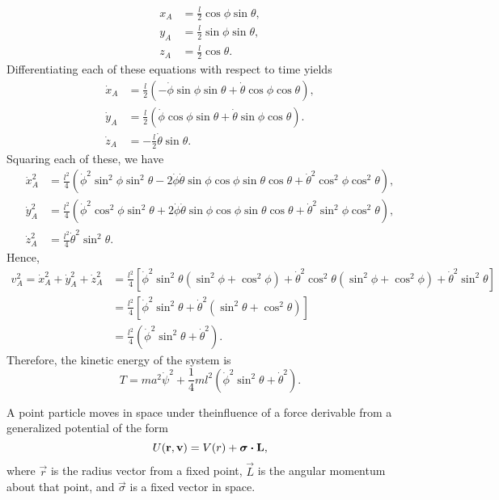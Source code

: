 \begin{questions}
\begin{solution}
\begin{align*}
x_A &= \frac{l}{2} \cos \phi \sin \theta, \\
y_A &= \frac{l}{2} \sin \phi \sin \theta, \\
z_A &= \frac{l}{2} \cos \theta.
\end{align*}
Differentiating each of these equations with respect to time yields
\begin{align*}
\dot{x}_A &= \frac{l}{2} ( -\dot{\phi} \sin \phi \sin \theta + \dot{\theta} \cos \phi \cos \theta ), \\
\dot{y}_A &= \frac{l}{2} ( \dot{\phi} \cos \phi \sin \theta + \dot{\theta} \sin \phi \cos \theta ). \\
\dot{z}_A &= -\frac{l}{2} \dot{\theta} \sin \theta.
\end{align*}
Squaring each of these, we have
\begin{align*}
\dot{x}_A^2 &= \frac{l^2}{4} ( \dot{\phi}^2 \sin^2 \phi \sin^2 \theta - 2 \dot{\phi} \dot{\theta} \sin \phi \cos \phi \sin \theta \cos \theta + \dot{\theta}^2 \cos^2 \phi \cos^2 \theta ), \\
\dot{y}_A^2 &= \frac{l^2}{4} ( \dot{\phi}^2 \cos^2 \phi \sin^2 \theta + 2 \dot{\phi} \dot{\theta} \sin \phi \cos \phi \sin \theta \cos \theta + \dot{\theta}^2 \sin^2 \phi \cos^2 \theta ), \\
\dot{z}_A^2 &= \frac{l^2}{4} \dot{\theta}^2 \sin^2 \theta. 
\end{align*}
Hence,
\begin{align*}
v_A^2 = \dot{x}_A^2 + \dot{y}_A^2 + \dot{z}_A^2 &= \frac{l^2}{4} [ \dot{\phi}^2 \sin^2 \theta ( \sin^2 \phi + \cos^2 \phi ) + \dot{\theta}^2 \cos^2 \theta ( \sin^2 \phi + \cos^2 \phi ) + \dot{\theta}^2 \sin^2 \theta ] \\
&= \frac{l^2}{4} [ \dot{\phi}^2 \sin^2 \theta + \dot{\theta}^2 ( \sin^2 \theta + \cos^2 \theta ) ] \\
&= \frac{l^2}{4} ( \dot{\phi}^2 \sin^2 \theta + \dot{\theta}^2 ).
\end{align*}
Therefore, the kinetic energy of the system is
\[
T = m a^2 \dot{\psi}^2 + \frac{1}{4} m l^2 ( \dot{\phi}^2 \sin^2 \theta + \dot{\theta}^2 ).
\]
\end{solution}

\question A point particle moves in space under theinfluence of a force derivable from a generalized potential of the form
\[
U ( \bm{\mathbf{r}}, \bm{\mathbf{v}} ) = V ( r ) + \bm{\mathbf{\sigma}} \boldsymbol{\cdot} \bm{\mathbf{L}},
\]
where $\vec{r}$ is the radius vector from a fixed point, $\vec{L}$ is the angular momentum about that point, and $\vec{\sigma}$ is a fixed vector in space.
\begin{parts}

\end{parts}
\end{questions}
